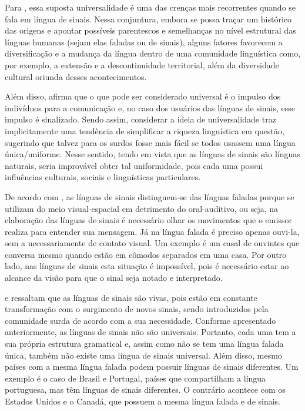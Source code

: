 Para , essa suposta universalidade é uma das crenças mais recorrentes quando se fala em língua de sinais. Nessa conjuntura, embora se possa traçar um histórico das origens e apontar possíveis parentescos e semelhanças no nível estrutural das línguas humanas (sejam elas faladas ou de sinais), alguns fatores favorecem a diversificação e a mudança da língua dentro de uma comunidade linguística como, por exemplo, a extensão e a descontinuidade territorial, além da diversidade cultural oriunda desses acontecimentos.

Além disso,  afirma que o que pode ser considerado universal é o impulso dos indivíduos para a comunicação e, no caso dos usuários das línguas de sinais, esse impulso é sinalizado. Sendo assim, considerar a ideia de universalidade traz implicitamente uma tendência de simplificar a riqueza linguística em questão, sugerindo que talvez para os surdos fosse mais fácil se todos usassem uma língua única/uniforme. Nesse sentido, tendo em vista que as línguas de sinais são línguas naturais, seria improvável obter tal uniformidade, pois cada uma possui influências culturais, sociais e linguísticas particulares. %

De acordo com , as línguas de sinais distinguem-se das línguas faladas porque se utilizam do meio visual-espacial em detrimento do oral-auditivo, ou seja, na elaboração das línguas de sinais é necessário olhar os movimentos que o emissor realiza para entender sua mensagem. Já na língua falada é preciso apenas ouvi-la, sem a necessariamente de contato visual. Um exemplo é um casal de ouvintes que conversa mesmo quando estão em cômodos separados em uma casa. Por outro lado, nas línguas de sinais esta situação é impossível, pois é necessário estar ao alcance da visão para que o sinal seja notado e interpretado.

 e  ressaltam que as línguas de sinais são vivas, pois estão em constante transformação com o surgimento de novos sinais, sendo introduzidos pela comunidade surda de acordo com a sua necessidade. Conforme apresentado anteriormente, as línguas de sinais não são universais. Portanto, cada uma tem a sua própria estrutura gramatical e, assim como não se tem uma língua falada única, também não existe uma língua de sinais universal. Além disso, mesmo países com a mesma língua falada podem possuir línguas de sinais diferentes. Um exemplo é o caso de Brasil e Portugal, países que compartilham a língua portuguesa, mas têm línguas de sinais diferentes. O contrário acontece com os Estados Unidos e o Canadá, que possuem a mesma língua falada e de sinais.

